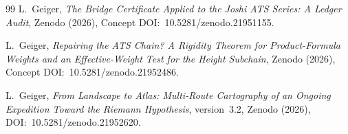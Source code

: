 \documentclass[12pt,a4paper]{article}
\theoremstyle{definition}
\theoremstyle{remark}
\begin{document}
\begin{thebibliography}{99}
L.~Geiger,
\emph{The Bridge Certificate Applied to the Joshi ATS Series:
A Ledger Audit},
Zenodo (2026), Concept DOI:~10.5281/zenodo.21951155.

L.~Geiger,
\emph{Repairing the ATS Chain?  A Rigidity Theorem for Product-Formula
Weights and an Effective-Weight Test for the Height Subchain},
Zenodo (2026), Concept DOI:~10.5281/zenodo.21952486.

L.~Geiger,
\emph{From Landscape to Atlas: Multi-Route Cartography of an Ongoing
Expedition Toward the Riemann Hypothesis},
version~3.2, Zenodo (2026), DOI:~10.5281/zenodo.21952620.

\end{thebibliography}
\end{document}
